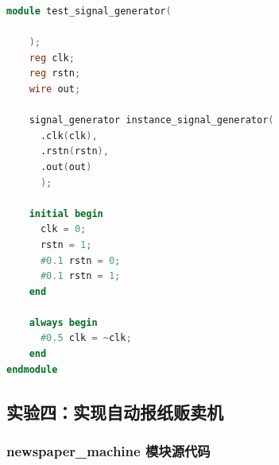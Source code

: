 \documentclass[zihao=5, UTF8]{article}
\theoremstyle{MyLineTheoremStyle} %
\theoremstyle{MyBlockTheoremStyle} %
\theoremstyle{MySubsubsectionStyle} %
\begin{document}
\begin{lstlisting}[language=Verilog]
module test_signal_generator(

    );
    reg clk;
    reg rstn;
    wire out;

    signal_generator instance_signal_generator(
      .clk(clk),
      .rstn(rstn),
      .out(out)
      );

    initial begin
      clk = 0;
      rstn = 1;
      #0.1 rstn = 0;
      #0.1 rstn = 1;
    end

    always begin
      #0.5 clk = ~clk;
    end
endmodule
\end{lstlisting}

\subsection{实验四：实现自动报纸贩卖机}

\subsubsection{newspaper\_machine 模块源代码}
\end{document}

